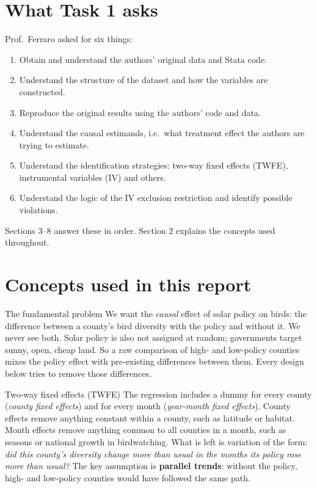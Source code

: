 \documentclass[11pt]{article}
\begin{document}
\section{What Task 1 asks}
Prof.\ Ferraro asked for six things:
\begin{enumerate}
\item Obtain and understand the authors' original data and Stata code.
\item Understand the structure of the dataset and how the variables are constructed.
\item Reproduce the original results using the authors' code and data.
\item Understand the causal estimands, i.e.\ what treatment effect the authors are trying to estimate.
\item Understand the identification strategies: two-way fixed effects (TWFE), instrumental variables (IV) and others.
\item Understand the logic of the IV exclusion restriction and identify possible violations.
\end{enumerate}
Sections 3--8 answer these in order. Section 2 explains the concepts used throughout.

\section{Concepts used in this report}

\begin{conceptbox}{The fundamental problem}
We want the \emph{causal} effect of solar policy on birds: the difference between a county's bird diversity with the policy and without it. We never see both. Solar policy is also not assigned at random; governments target sunny, open, cheap land. So a raw comparison of high- and low-policy counties mixes the policy effect with pre-existing differences between them. Every design below tries to remove those differences.
\end{conceptbox}

\begin{conceptbox}{Two-way fixed effects (TWFE)}
The regression includes a dummy for every county (\emph{county fixed effects}) and for every month (\emph{year-month fixed effects}). County effects remove anything constant within a county, such as latitude or habitat. Month effects remove anything common to all counties in a month, such as seasons or national growth in birdwatching. What is left is variation of the form: \emph{did this county's diversity change more than usual in the months its policy rose more than usual?} The key assumption is \textbf{parallel trends}: without the policy, high- and low-policy counties would have followed the same path.
\end{conceptbox}
\end{document}
